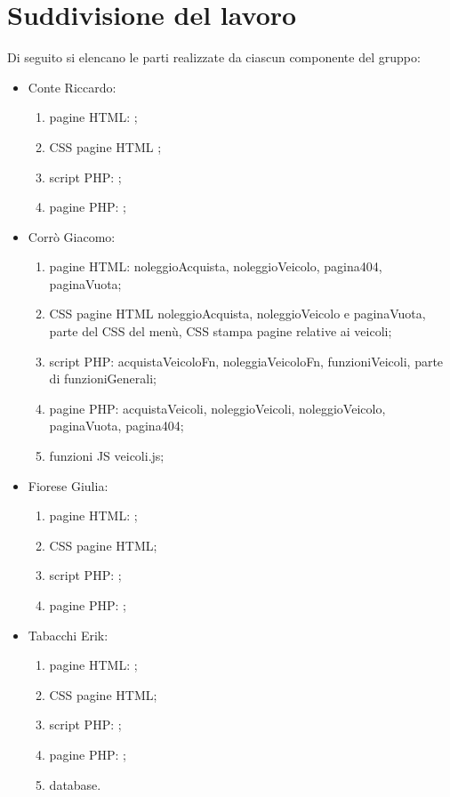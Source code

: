 \section{Suddivisione del lavoro}
Di seguito si elencano le parti realizzate da ciascun componente del gruppo:
\begin{itemize}
    \item Conte Riccardo:
        \begin{enumerate}
        \item pagine HTML: ;
        \item CSS pagine HTML ;
        \item script PHP: ;
        \item pagine PHP: ;
        \end{enumerate}
    \item Corrò Giacomo:
        \begin{enumerate}
            \item pagine HTML: noleggioAcquista, noleggioVeicolo, pagina404, paginaVuota;
            \item CSS pagine HTML noleggioAcquista, noleggioVeicolo e paginaVuota, parte del CSS del menù, CSS stampa pagine relative ai veicoli;
            \item script PHP: acquistaVeicoloFn, noleggiaVeicoloFn, funzioniVeicoli, parte di funzioniGenerali;
            \item pagine PHP: acquistaVeicoli, noleggioVeicoli, noleggioVeicolo, paginaVuota, pagina404;
            \item funzioni JS veicoli.js;
        \end{enumerate}
    \item Fiorese Giulia:
        \begin{enumerate}
            \item pagine HTML: ;
            \item CSS pagine HTML;
            \item script PHP: ;
            \item pagine PHP: ;
        \end{enumerate}
    \item Tabacchi Erik:
        \begin{enumerate}
            \item pagine HTML: ;
            \item CSS pagine HTML;
            \item script PHP: ;
            \item pagine PHP: ;
            \item database.
        \end{enumerate}
\end{itemize}
